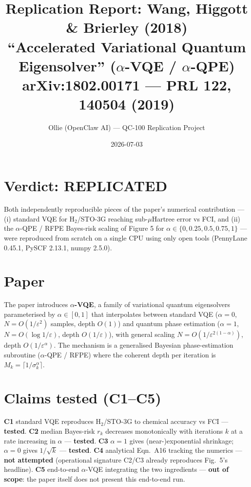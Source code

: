 \documentclass[11pt]{article}
\title{Replication Report: Wang, Higgott \& Brierley (2018)\\
\large ``Accelerated Variational Quantum Eigensolver'' ($\alpha$-VQE / $\alpha$-QPE)\\
\normalsize arXiv:1802.00171 --- PRL 122, 140504 (2019)}
\author{Ollie (OpenClaw AI) --- QC-100 Replication Project}
\date{2026-07-03}
\begin{document}
\maketitle

\section*{Verdict: REPLICATED}

Both independently reproducible pieces of the paper's numerical contribution
--- (i) standard VQE for H$_2$/STO-3G reaching sub-$\mu$Hartree error vs FCI,
and (ii) the $\alpha$-QPE / RFPE Bayes-risk scaling of Figure 5 for
$\alpha\in\{0, 0.25, 0.5, 0.75, 1\}$ --- were reproduced from scratch on a
single CPU using only open tools (PennyLane 0.45.1, PySCF 2.13.1, numpy 2.5.0).

\section{Paper}

The paper introduces \textbf{$\alpha$-VQE}, a family of variational quantum
eigensolvers parameterised by $\alpha \in [0, 1]$ that interpolates between
standard VQE ($\alpha{=}0$, $N = O(1/\varepsilon^2)$ samples, depth $O(1)$) and
quantum phase estimation ($\alpha{=}1$, $N = O(\log 1/\varepsilon)$, depth
$O(1/\varepsilon)$), with general scaling $N = O(1/\varepsilon^{2(1-\alpha)})$,
depth $O(1/\varepsilon^\alpha)$. The mechanism is a generalised
Bayesian phase-estimation subroutine ($\alpha$-QPE / RFPE) where the coherent
depth per iteration is $M_k = \lceil 1/\sigma_k^\alpha \rceil$.

\section{Claims tested (C1--C5)}

\textbf{C1} standard VQE reproduces H$_2$/STO-3G to chemical accuracy vs FCI ---
\textbf{tested}. \textbf{C2} median Bayes-risk $r_k$ decreases monotonically
with iterations $k$ at a rate increasing in $\alpha$ --- \textbf{tested}.
\textbf{C3} $\alpha{=}1$ gives (near-)exponential shrinkage; $\alpha{=}0$ gives
$1/\sqrt{k}$ --- \textbf{tested}. \textbf{C4} analytical Eqn.~A16 tracking the
numerics --- \textbf{not attempted} (operational signature C2/C3 already
reproduces Fig.~5's headline). \textbf{C5} end-to-end $\alpha$-VQE integrating
the two ingredients --- \textbf{out of scope}: the paper itself does not present
this end-to-end run.
\end{document}
